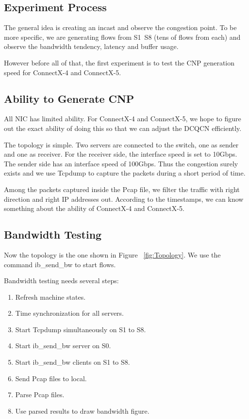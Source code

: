 \documentclass[12pt,a4paper]{article}
\begin{document}
\subsection{Experiment Process}

The general idea is creating an incast and observe the congestion point.
To be more specific, we are generating flows from S1~S8 (tens of flows from each) and observe the bandwidth tendency, latency and buffer usage.

However before all of that, the first experiment is to test the CNP generation speed for ConnectX-4 and ConnectX-5. 

\subsection{Ability to Generate CNP}

All NIC has limited ability. For ConnectX-4 and ConnectX-5, we hope to figure out the exact ability of doing this so that we can adjust the DCQCN efficiently.

The topology is simple. Two servers are connected to the switch, one as sender and one as receiver.
For the receiver side, the interface speed is set to 10Gbps. The sender side has an interface speed of 100Gbps.
Thus the congestion surely exists and we use Tcpdump to capture the packets during a short period of time.

Among the packets captured inside the Pcap file, we filter the traffic with right direction and right IP addresses out.
According to the timestamps, we can know something about the ability of ConnectX-4 and ConnectX-5.

\subsection{Bandwidth Testing}

Now the topology is the one shown in Figure ~\ref{fig:Topology}.
We use the command ib\_send\_bw to start flows.

Bandwidth testing needs several steps:
\begin{enumerate}
	\item Refresh machine states.
	\item Time synchronization for all servers.
	\item Start Tcpdump simultaneously on S1 to S8.
	\item Start ib\_send\_bw server on S0.
	\item Start ib\_send\_bw clients on S1 to S8.
	\item Send Pcap files to local.
	\item Parse Pcap files.
	\item Use parsed results to draw bandwidth figure.
\end{enumerate}
\end{document}
